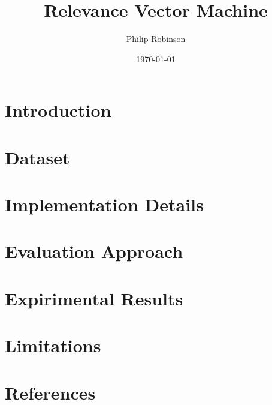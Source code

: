\documentclass[10pt,twocolumn]{article} %
\title{Relevance Vector Machine}
\date{\today}
\author{Philip Robinson}
\affil{Oregon Health Sciences University}
\begin{document}
\maketitle
{}
\begin{abstract}
\end{abstract}

\section{Introduction}
\section{Dataset}
\section{Implementation Details}
\section{Evaluation Approach}
\section{Expirimental Results}
\section{Limitations}
\section{References}
\end{document}
